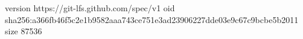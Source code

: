 version https://git-lfs.github.com/spec/v1
oid sha256:a366fb46f5c2e1b9582aaa743ce751e3ad23906227dde03e9c67c9bcbe5b2011
size 87536
